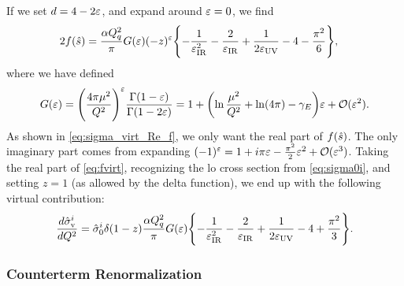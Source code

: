 If we set $d=4-2\varepsilon$, and expand around $\varepsilon=0$, we find
\begin{align}
    2f(\hat{s}) &= \frac{\alpha Q_q^2}{\pi} G(\varepsilon) (-z)^\varepsilon \Biggl\{
        -\frac{1}{\varepsilon_{\mathrm{IR}}^2} - \frac{2}{\varepsilon_{\mathrm{IR}}} + \frac{1}{2\varepsilon_{\mathrm{UV}}} - 4 - \frac{\pi^2}{6}
    \Biggr\},
    \label{eq:fvirt}
\end{align}
where we have defined
\begin{equation}
    G(\varepsilon) = \Biggl( \frac{4\pi\mu^2}{Q^2} \Biggr)^\varepsilon \frac{\Gamma(1-\varepsilon)}{\Gamma(1-2\varepsilon)}
    = 1 + \biggl( \ln\frac{\mu^2}{Q^2} + \ln(4\pi)-\gamma_E \biggr) \varepsilon + \mathcal{O}(\varepsilon^2).
\label{eq:G_eps}
\end{equation}
As shown in \cref{eq:sigma_virt_Re_f}, we only want the real part of $f(\hat{s})$. The only imaginary part comes from expanding $(-1)^\varepsilon = 1 + i\pi\varepsilon - \frac{\pi^2}{2} \varepsilon^2 + \mathcal{O}(\varepsilon^3)$. Taking the real part of \cref{eq:fvirt}, recognizing the \gls{lo} cross section from \cref{eq:sigma0i}, and setting $z=1$ (as allowed by the delta function), we end up with the following virtual contribution:
\begin{equation}
    \frac{d\hat\sigma^i_{\mathrm{v}}}{dQ^2} = \hat\sigma^i_0 \delta(1-z) \frac{\alpha Q_q^2}{\pi} G(\varepsilon)
    \Biggl\{
        -\frac{1}{\varepsilon_{\mathrm{IR}}^2} - \frac{2}{\varepsilon_{\mathrm{IR}}} + \frac{1}{2\varepsilon_{\mathrm{UV}}} - 4 + \frac{\pi^2}{3}
    \Biggr\}.
    \label{eq:dsigmai_virt}
\end{equation}


\subsubsection{Counterterm Renormalization}


